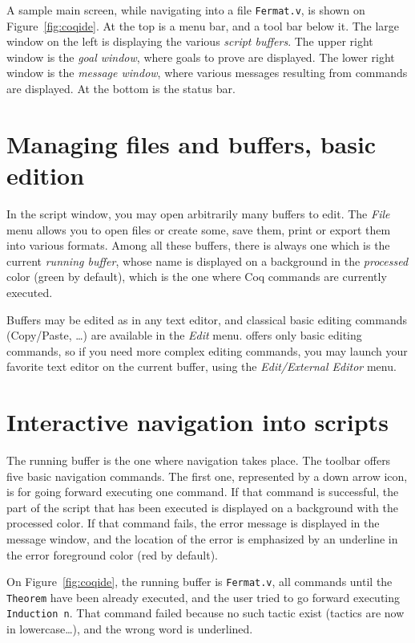 A sample \CoqIDE{} main screen, while navigating into a file
\verb|Fermat.v|, is shown on Figure~\ref{fig:coqide}.  At
the top is a menu bar, and a tool bar below it. The large window on
the left is displaying the various \emph{script buffers}. The upper right
window is the \emph{goal window}, where goals to 
prove are displayed. The lower right window is the \emph{message window},
where various messages resulting from commands are displayed. At the
bottom is the status bar.

\section{Managing files and buffers, basic edition}

In the script window, you may open arbitrarily many buffers to
edit. The \emph{File} menu allows you to open files or create some,
save them, print or export them into various formats. Among all these
buffers, there is always one which is the current
\emph{running buffer}, whose name is displayed on a background in the
\emph{processed} color (green by default), which is the one where Coq commands
are currently executed.

Buffers may be edited as in any text editor, and classical basic
editing commands (Copy/Paste, \ldots) are available in the \emph{Edit}
menu. \CoqIDE{} offers only basic editing commands, so if you need
more complex editing commands, you may launch your favorite text
editor on the current buffer, using the \emph{Edit/External Editor}
menu. 

\section{Interactive navigation into \Coq{} scripts}

The running buffer is the one where navigation takes place. The
toolbar offers five basic navigation commands. The first one,
represented by a down arrow icon, is for going forward executing one
command. If that command is successful, the part of the script that
has been executed is displayed on a background with the
processed color. If that command fails, the error message is
displayed in the message window, and the location of the error is
emphasized by an underline in the error foreground color (red by default).

On Figure~\ref{fig:coqide}, the running buffer is \verb|Fermat.v|, all
commands until the \verb|Theorem| have been already executed, and the
user tried to go forward executing \verb|Induction n|. That command
failed because no such tactic exist (tactics are now in
lowercase\ldots), and the wrong word is underlined. 

